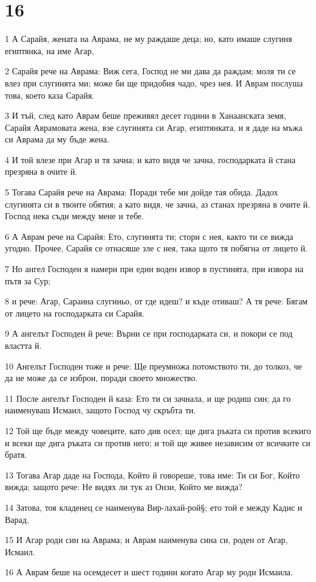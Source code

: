 \chapter{16}

\par 1 А Сарайя, жената на Аврама, не му раждаше деца; но, като имаше слугиня египтянка, на име Агар,
\par 2 Сарайя рече на Аврама: Виж сега, Господ не ми дава да раждам; моля ти се влез при слугинята ми; може би ще придобия чадо, чрез нея. И Аврам послуша това, което каза Сарайя.
\par 3 И тъй, след като Аврам беше преживял десет години в Ханаанската земя, Сарайя Аврамовата жена, взе слугинята си Агар, египтянката, и я даде на мъжа си Аврама да му бъде жена.
\par 4 И той влезе при Агар и тя зачна; и като видя че зачна, господарката й стана презряна в очите й.
\par 5 Тогава Сарайя рече на Аврама: Поради тебе ми дойде тая обида. Дадох слугинята си в твоите обятия; а като видя, че зачна, аз станах презряна в очите й. Господ нека съди между мене и тебе.
\par 6 А Аврам рече на Сарайя: Ето, слугинята ти; стори с нея, както ти се вижда угодно. Прочее, Сарайя се отнасяше зле с нея, така щото тя побягна от лицето й.
\par 7 Но ангел Господен я намери при един воден извор в пустинята, при извора на пътя за Сур;
\par 8 и рече: Агар, Сараина слугиньо, от где идеш? и къде отиваш? А тя рече: Бягам от лицето на господарката си Сарайя.
\par 9 А ангелът Господен й рече: Върни се при господарката си, и покори се под властта й.
\par 10 Ангелът Господен тоже и рече: Ще преумножа потомството ти, до толкоз, че да не може да се изброи, поради своето множество.
\par 11 После ангелът Господен й каза: Ето ти си зачнала, и ще родиш син; да го наименуваш Исмаил, защото Господ чу скръбта ти.
\par 12 Той ще бъде между човеците, като див осел; ще дига ръката си против всекиго и всеки ще дига ръката си против него; и той ще живее независим от всичките си братя.
\par 13 Тогава Агар даде на Господа, Който й говореше, това име: Ти си Бог, Който вижда; защото рече: Не видях ли тук аз Онзи, Който ме вижда?
\par 14 Затова, тоя кладенец се наименува Вир-лахай-рой§; ето той е между Кадис и Варад.
\par 15 И Агар роди син на Аврама; и Аврам наименува сина си, роден от Агар, Исмаил.
\par 16 А Аврам беше на осемдесет и шест години когато Агар му роди Исмаила.


